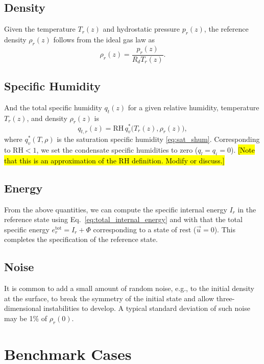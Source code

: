 \documentclass{report}
\begin{document}
\section{Density}
 
Given the temperature $T_r(z)$ and hydrostatic pressure $p_r(z)$, the reference density $\rho_r(z)$ follows from the ideal gas law as
\begin{equation}\label{eq:hydro_density}
    \rho_r(z) = \frac{p_r(z)}{R_d T_r(z)}.
\end{equation}

\section{Specific Humidity}

And the total specific humidity $q_t(z)$ for a given relative humidity, temperature $T_r(z)$, and density $\rho_r(z)$ is
\begin{equation}
    q_{t,r}(z) = \mathrm{RH} \, q_v^*\bigl( T_r(z), \rho_r(z) \bigr),
\end{equation}
where $q_v^*(T, \rho)$ is the saturation specific humidity \eqref{eq:sat_shum}. Corresponding to $\mathrm{RH} < 1$, we set the condensate specific humidities to zero ($q_l = q_i = 0$). \hl{[Note that this is an approximation of the RH definition. Modify or discuss.]}

\section{Energy}

From the above quantities, we can compute the specific internal energy $I_r$ in the reference state using Eq.~\eqref{eq:total_internal_energy} and with that the total specific energy $e^{\mathrm{tot}}_r = I_r + \Phi$ corresponding to a state of rest ($\vec{u}=0$). This completes the specification of the reference state.

\section{Noise}

It is common to add a small amount of random noise, e.g., to the initial density at the surface, to break the symmetry of the initial state and allow three-dimensional instabilities to develop. A typical standard deviation of such noise may be 1\% of $\rho_r(0)$.


\chapter{Benchmark Cases}\label{c:benchmarks}
\end{document}
